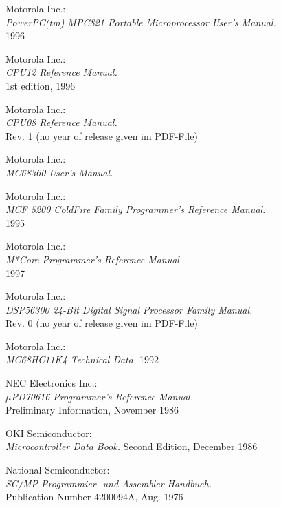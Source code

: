  Motorola Inc.: \\
                 {\em PowerPC(tm) MPC821 Portable Microprocessor User's Manual.\/} \\
                 1996

 Motorola Inc.: \\
                {\em CPU12 Reference Manual.\/} \\
                1st edition, 1996

 Motorola Inc.: \\
                {\em CPU08 Reference Manual.\/} \\
                Rev. 1 (no year of release given im PDF-File)

 Motorola Inc.: \\
                 {\em MC68360 User's Manual.\/}

 Motorola Inc.: \\
                  {\em MCF 5200 ColdFire Family Programmer's Reference
                   Manual.\/} \\
                  1995

 Motorola Inc.: \\
                   {\em M*Core Programmer's Reference Manual.\/} \\
                   1997

 Motorola Inc.: \\
                   {\em DSP56300 24-Bit Digital Signal Processor
                    Family Manual.\/} \\
                   Rev. 0 (no year of release given im PDF-File)

 Motorola Inc.: \\
                {\em MC68HC11K4 Technical Data.\/}
                1992

 NEC Electronics Inc.: \\
                {\em $\mu$PD70616 Programmer's Reference Manual.\/} \\
                Preliminary Information, November 1986

 OKI Semiconductor: \\
                {\em Microcontroller Data Book.\/}
                Second Edition, December 1986

 National Semiconductor: \\
               {\em SC/MP Program\-mier- und
                As\-sem\-bler-Hand\-buch.\/} \\
               Publication Number 4200094A, Aug. 1976


